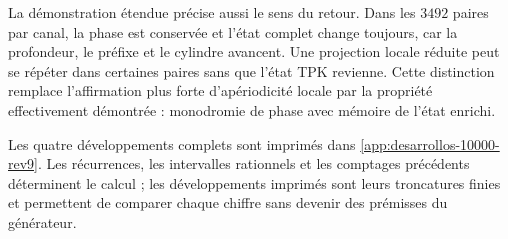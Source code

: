 La démonstration étendue précise aussi le sens du retour. Dans les
\(3492\) paires par canal, la phase est conservée et l'état
complet change toujours, car la profondeur, le préfixe et le cylindre avancent. Une projection locale
réduite peut se répéter dans certaines paires sans que l'état TPK revienne. Cette
distinction remplace l'affirmation plus forte d'apériodicité locale par la
propriété effectivement démontrée : monodromie de phase avec mémoire de l'état
enrichi.

Les quatre développements complets sont imprimés dans
\cref{app:desarrollos-10000-rev9}. Les récurrences, les intervalles
rationnels et les comptages précédents déterminent le calcul ; les développements
imprimés sont leurs troncatures finies et permettent de comparer chaque chiffre sans
devenir des prémisses du générateur.
